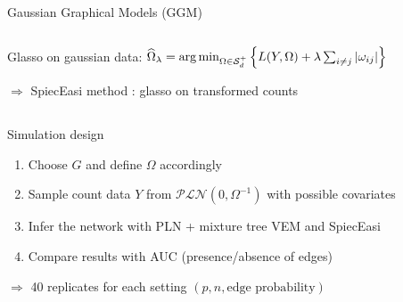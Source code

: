 \documentclass[aspectratio=169]{beamer}
\newcommand{\emphase}[1]{\textcolor{Complement}{#1}}
\begin{document}
\begin{frame}{Gaussian Graphical Models (GGM) }
\begin{columns}
\begin{column}{8cm}
  \end{column}
  \end{columns}
  \pause
 \emphase{Glasso on gaussian data:}\hspace{0.2cm} $\widehat{\Omega}_\lambda = \arg\min_{\Omega \in \mathcal{S}_d^+}\left\{ L(Y,\Omega)+\lambda \sum_{i\neq j} |\omega_{ij}| \right\} \hspace{0.5cm} $\\
 \begin{center}
	$\Rightarrow$ {\color{Framableulight}SpiecEasi method \cite{kurtz}}: glasso on transformed counts
\end{center}


\end{frame}

\subsection{}

\begin{frame}{Simulation design}

\begin{enumerate}
     \item Choose  \emphase{$G$} and define  \emphase{$\Omega$} accordingly\vspace{0.3cm} 
     \item Sample count data \emphase{$Y$} from $\mathcal{PLN}(0,\Omega^{-1})$ with possible covariates
     \item Infer the network with \emphase{PLN + mixture tree VEM}  and \emphase{SpiecEasi} \vspace{0.3cm}
     \item Compare results with \emphase{AUC} (presence/absence of edges)
\end{enumerate}\bigskip\bigskip
\hspace{1cm}$\Rightarrow$ 40 replicates for each setting $(p, n, \text{edge probability})$
	
\end{frame}
\end{document}
